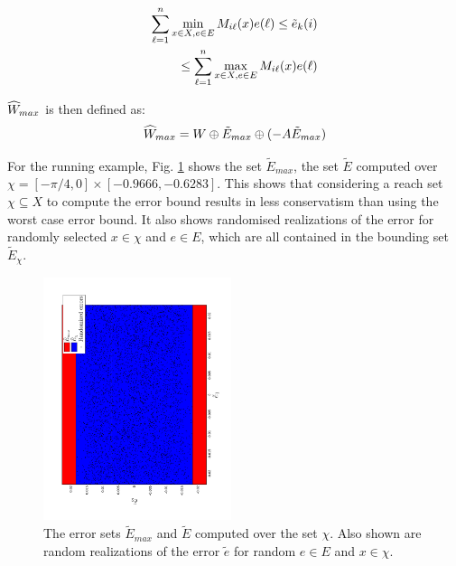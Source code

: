\begin{eqnarray}
\label{eq:EtildeMax}
\sum_{\ell=1}^{n} \min_{x \in X, e \in E} M_{i\ell}(x)e(\ell)  \leq \tilde{e}_{k}(i) 
\nonumber 
\\
\leq \sum_{\ell=1}^{n} \max_{x \in X, e \in E} M_{i\ell}(x)e(\ell)
\end{eqnarray}

$\widehat{W}_{max}$ is then defined as:
\begin{equation}
\widehat{W}_{max} = W \oplus \tilde{E}_{max} \oplus (-A\tilde{E}_{max})
\end{equation}

For the running example, Fig. \ref{fig:err_bound_toy} shows the set $\tilde{E}_{max}$, the set $\tilde{E}$ computed over $\chi = [-\pi/4,0]\times[-0.9666,-0.6283]$. This shows that considering a reach set $\chi \subseteq X$ to compute the error bound results in less conservatism than using the worst case error bound. It also shows randomised realizations of the error for randomly selected $x \in \chi$ and $e \in E$, which are all contained in the bounding set $\tilde{E}_{\chi}$.

\begin{figure}
\includegraphics[angle=270,width=0.49\textwidth]{figs/Err_Bounds_toy.pdf}
\caption{The error sets $\tilde{E}_{max}$ and $\tilde{E}$ computed over the set $\chi$. Also shown are random realizations of the error $\tilde{e}$ for random $e \in E$ and $x \in \chi$.}
\label{fig:err_bound_toy}
\end{figure}

